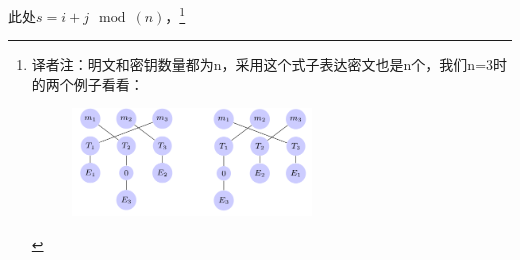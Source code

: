 \documentclass[]{article}
\begin{document}
此处$s=i+j \mod(n)$，\footnote{译者注：明文和密钥数量都为n，采用这个式子表达密文也是n个，我们n=3时的两个例子看看：
%	
%	
%	
%	
%	
%
%	
%	
%	
%	
%	
%	
%	
%	
\begin{figure}[H]
	\includegraphics[width=0.6\textwidth]{tran-sample1.png}
\end{figure}
}
\end{document}
